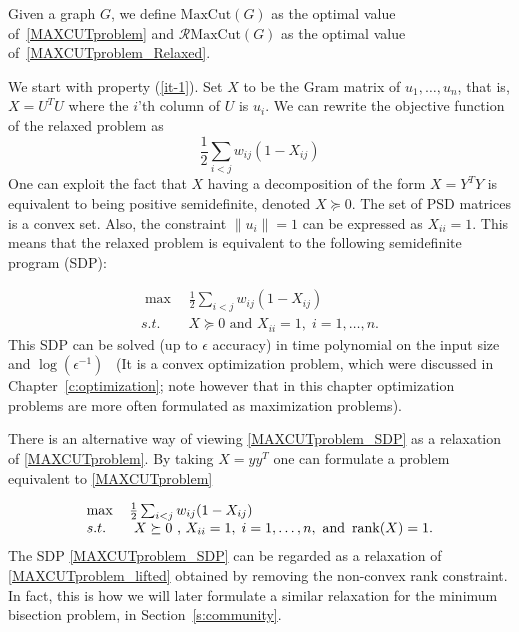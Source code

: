  \begin{definition}\label{def_maxcut_rmaxcut}
 Given a graph $G$, we define $\mathrm{MaxCut}(G)$ as the optimal value of~\eqref{MAXCUTproblem} and $\mathcal{R}\mathrm{MaxCut}(G)$ as the optimal value of~\eqref{MAXCUTproblem_Relaxed}.
 \end{definition}
 
We start with property (\ref{it-1}). Set $X$ to be the Gram matrix of $u_1,\ldots,u_n$, that is, $X=U^TU$ where the $i$'th column of $U$ is $u_i$. We can rewrite the objective function of the relaxed problem as $$\frac12\sum_{i<j}w_{ij}(1-X_{ij})$$ One can exploit the fact that $X$ having a decomposition of the form $X=Y^TY$ is equivalent to being positive semidefinite, denoted $X\succeq 0$. The set of PSD matrices is a convex set. Also, the constraint $\|u_i\|=1$ can be expressed as $X_{ii}=1$. This means that the relaxed problem is equivalent to the following semidefinite program (SDP):

\begin{equation}\label{MAXCUTproblem_SDP}
\begin{array}{l}
\max \quad  \frac12 \sum_{i<j}w_{ij}(1-X_{ij}) \\
s.t. \quad \quad X\succeq 0 \text{ and } X_{ii}=1,\; i=1,\ldots,n.
\end{array}
\end{equation}
This SDP can be solved (up to $\epsilon$ accuracy) in time polynomial on the input size and $\log(\epsilon^{-1})$~\cite{LVanderberghe_SBoyd_1996} (It is a convex optimization problem, which were discussed in Chapter~\ref{c:optimization}; note however that in this chapter optimization problems are more often formulated as maximization problems).

There is an alternative way of viewing \eqref{MAXCUTproblem_SDP} as a relaxation of \eqref{MAXCUTproblem}. By taking $X = yy^T$ one can formulate a problem equivalent to \eqref{MAXCUTproblem}

\begin{equation}\label{MAXCUTproblem_lifted}
\begin{array}{l}
\max \quad  \frac12 \sum_{i<j}w_{ij}(1-X_{ij}) \\
s.t. \quad \quad X\succeq 0 \text{ , } X_{ii}=1,\; i=1,\ldots,n, \text{ and } \operatorname{rank}(X) = 1.
\end{array}
\end{equation}
The SDP \eqref{MAXCUTproblem_SDP} can be regarded as a relaxation of \eqref{MAXCUTproblem_lifted} obtained by removing the non-convex rank constraint. In fact, this is how we will later formulate a similar relaxation for the minimum bisection problem, in Section~\ref{s:community}.

